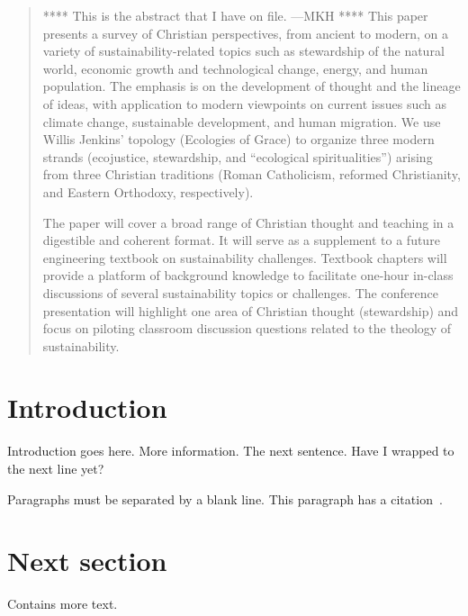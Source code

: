 \documentclass[12pt]{article}
\begin{document}
	
\maketitle

\begin{abstract}
**** This is the abstract that I have on file. ---MKH ****
This paper presents a survey of Christian perspectives, 
from ancient to modern, 
on a variety of sustainability-related topics such as stewardship of the natural world, 
economic growth and technological change, energy, and human population. 
The emphasis is on the development of thought and the lineage of ideas, 
with application to modern viewpoints on current issues 
such as climate change, sustainable development, and human migration. 
We use Willis Jenkins’ topology (Ecologies of Grace) 
to organize three modern strands 
(ecojustice, stewardship, and “ecological spiritualities”) 
arising from three Christian traditions 
(Roman Catholicism, reformed Christianity, and Eastern Orthodoxy, respectively).

The paper will cover a broad range of Christian thought and teaching 
in a digestible and coherent format. 
It will serve as a supplement to a future engineering textbook on sustainability challenges. 
Textbook chapters will provide a platform 
of background knowledge to facilitate one-hour in-class discussions
of several sustainability topics or challenges. 
The conference presentation will highlight 
one area of Christian thought (stewardship) 
and focus on piloting classroom discussion questions related to the theology of sustainability.
\end{abstract}


\section{Introduction}
\label{sec:introduction}

Introduction goes here. 
More information. 
The next sentence. 
Have I wrapped to the next line yet?

Paragraphs must be separated by a blank line.
This paragraph has a citation~\autocite{bogus}.


\section{Next section}
\label{sec:next_sect}

Contains more text.


\printbibliography
\end{document}
